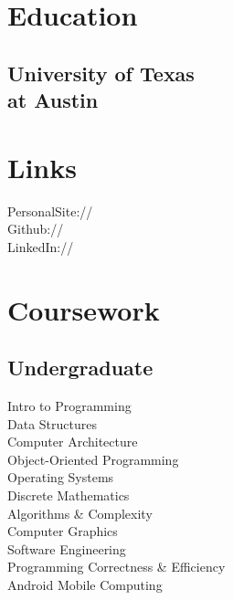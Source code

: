 \documentclass[]{deedy-resume-openfont}
\begin{document}

%
%

\begin{minipage}[t]{0.33\textwidth} 


\section{Education} 

\subsection{University of Texas\\ at Austin}
\sectionsep


\section{Links}
PersonalSite:// \href{https://andrewdang-tran.github.io/}{} \\
Github:// \href{https://github.com/AndrewDang-Tran}{} \\
LinkedIn://  \href{https://www.linkedin.com/in/andrew-dang-tran-a57144bb}{} \\
\sectionsep


\section{Coursework}
\subsection{Undergraduate}
Intro to Programming \\
Data Structures \\
Computer Architecture \\
Object-Oriented Programming \\
Operating Systems \\
Discrete Mathematics \\
Algorithms \& Complexity \\
Computer Graphics \\
Software Engineering \\
Programming Correctness \& Efficiency \\
Android Mobile Computing \\
\sectionsep


\end{minipage}
\end{document}
